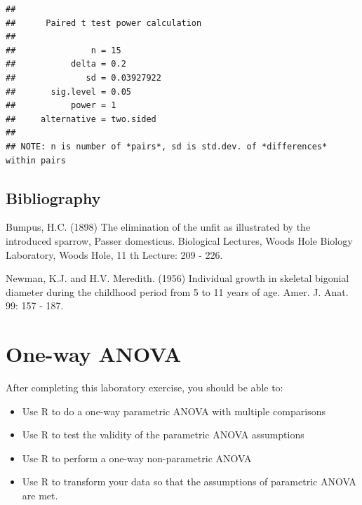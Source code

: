 \documentclass[
  12pt,
]{book}
\newenvironment{Shaded}{\begin{snugshade}}{\end{snugshade}}
\newcommand{\DataTypeTok}[1]{\textcolor[rgb]{0.13,0.29,0.53}{#1}}
\newcommand{\DecValTok}[1]{\textcolor[rgb]{0.00,0.00,0.81}{#1}}
\newcommand{\KeywordTok}[1]{\textcolor[rgb]{0.13,0.29,0.53}{\textbf{#1}}}
\newcommand{\NormalTok}[1]{#1}
\newcommand{\OperatorTok}[1]{\textcolor[rgb]{0.81,0.36,0.00}{\textbf{#1}}}
\newcommand{\StringTok}[1]{\textcolor[rgb]{0.31,0.60,0.02}{#1}}
\providecommand{\tightlist}{%
  \setlength{\itemsep}{0pt}\setlength{\parskip}{0pt}}
\begin{document}
\begin{Shaded}
\end{Shaded}

\begin{verbatim}
## 
##      Paired t test power calculation 
## 
##               n = 15
##           delta = 0.2
##              sd = 0.03927922
##       sig.level = 0.05
##           power = 1
##     alternative = two.sided
## 
## NOTE: n is number of *pairs*, sd is std.dev. of *differences* within pairs
\end{verbatim}

\hypertarget{bibliography}{%
\section{Bibliography}\label{bibliography}}

Bumpus, H.C. (1898) The elimination of the unfit as illustrated by the introduced sparrow, Passer domesticus. Biological Lectures, Woods Hole Biology Laboratory, Woods Hole, 11 th Lecture: 209 - 226.

Newman, K.J. and H.V. Meredith. (1956) Individual growth in skeletal bigonial diameter during the childhood period from 5 to 11 years of age. Amer. J. Anat. 99: 157 - 187.

\hypertarget{one-way-anova}{%
\chapter{One-way ANOVA}\label{one-way-anova}}

After completing this laboratory exercise, you should be able to:

\begin{itemize}
\tightlist
\item
  Use R to do a one-way parametric ANOVA with multiple comparisons
\item
  Use R to test the validity of the parametric ANOVA assumptions
\item
  Use R to perform a one-way non-parametric ANOVA
\item
  Use R to transform your data so that the assumptions of parametric ANOVA are met.
\end{itemize}
\end{document}
